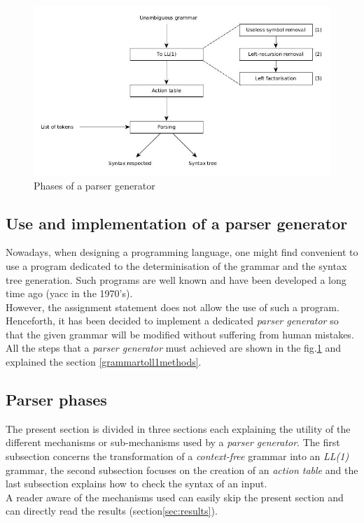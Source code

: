 \documentclass[a4paper,11pt]{article}
\begin{document}
  \begin{figure}[h!]
    \centering
    \includegraphics[scale=0.5]{./img/phase_of_parsing.jpg}
    \caption{Phases of a parser generator}
    \label{fig:parsergeneratorphases}
  \end{figure}
  
  \subsection{Use and implementation of a parser generator}
  Nowadays, when designing a programming language, one might find convenient to use a program dedicated to the determinisation of the grammar and the syntax tree generation. Such programs are well known and have been developed a long time ago (yacc in the 1970's).\\
  However, the assignment statement does not allow the use of such a program. Henceforth, it has been decided to implement a dedicated \textit{parser generator} so that the given grammar will be modified without suffering from human mistakes. All the steps that a \textit{parser generator} must achieved are shown in the fig.\ref{fig:parsergeneratorphases} and explained the section \ref{grammartoll1methods}.
  
  \subsection{Parser phases}
    The present section is divided in three sections each explaining the utility of the different mechanisms or sub-mechanisms used by a \textit{parser generator}. The first subsection concerns the transformation of a \textit{context-free} grammar into an \textit{LL(1)} grammar, the second subsection focuses on the creation of an \textit{action table} and the last subsection explains how to check the syntax of an input.\\
    A reader aware of the mechanisms used can easily skip the present section and can directly read the results (section\ref{sec:results}).
  
\end{document}
